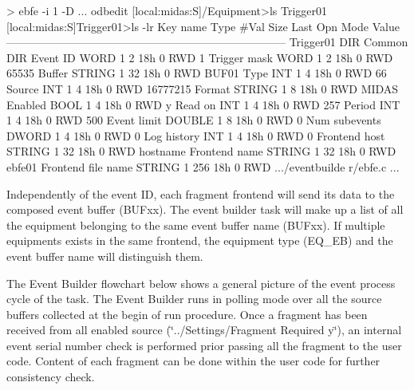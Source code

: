 \begin{DoxyCode}
> ebfe -i 1 -D
...
odbedit
[local:midas:S]/Equipment>ls
Trigger01
[local:midas:S]Trigger01>ls -lr
Key name                        Type    #Val  Size  Last Opn Mode Value
---------------------------------------------------------------------------
Trigger01                       DIR
    Common                      DIR
        Event ID                WORD    1     2     18h  0   RWD  1
        Trigger mask            WORD    1     2     18h  0   RWD  65535
        Buffer                  STRING  1     32    18h  0   RWD  BUF01
        Type                    INT     1     4     18h  0   RWD  66
        Source                  INT     1     4     18h  0   RWD  16777215
        Format                  STRING  1     8     18h  0   RWD  MIDAS
        Enabled                 BOOL    1     4     18h  0   RWD  y
        Read on                 INT     1     4     18h  0   RWD  257
        Period                  INT     1     4     18h  0   RWD  500
        Event limit             DOUBLE  1     8     18h  0   RWD  0
        Num subevents           DWORD   1     4     18h  0   RWD  0
        Log history             INT     1     4     18h  0   RWD  0
        Frontend host           STRING  1     32    18h  0   RWD  hostname
        Frontend name           STRING  1     32    18h  0   RWD  ebfe01
        Frontend file name      STRING  1     256   18h  0   RWD  .../eventbuilde
      r/ebfe.c
...
\end{DoxyCode}


Independently of the event ID, each fragment frontend will send its data to the composed event buffer (BUFxx). The event builder task will make up a list of all the equipment belonging to the same event buffer name (BUFxx). If multiple equipments exists in the same frontend, the equipment type (EQ\_\-EB) and the event buffer name will distinguish them.

\label{FE_Event_Builder_idx_event_builder_flowchart}
\hypertarget{FE_Event_Builder_idx_event_builder_flowchart}{}
 The Event Builder flowchart below shows a general picture of the event process cycle of the task. The Event Builder runs in polling mode over all the source buffers collected at the begin of run procedure. Once a fragment has been received from all enabled source (\char`\"{}../Settings/Fragment Required y\char`\"{}), an internal event serial number check is performed prior passing all the fragment to the user code. Content of each fragment can be done within the user code for further consistency check.


